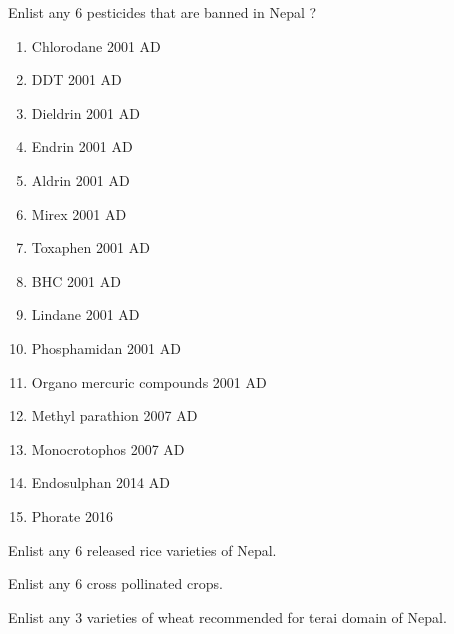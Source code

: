 \documentclass[10pt,a4paper]{exam}
\begin{document}
\begin{questions}
\question Enlist any 6 pesticides that are banned in Nepal ?
  \begin{solution}
  \begin{enumerate}
  \item Chlorodane 2001 AD
  \item DDT 2001 AD
  \item Dieldrin 2001 AD
  \item Endrin 2001 AD
  \item Aldrin 2001 AD
  \item Mirex 2001 AD
  \item Toxaphen 2001 AD
  \item BHC 2001 AD
  \item Lindane 2001 AD
  \item Phosphamidan 2001 AD
  \item Organo mercuric compounds 2001 AD
  \item Methyl parathion 2007 AD
  \item Monocrotophos 2007 AD
  \item Endosulphan 2014 AD
  \item Phorate 2016
  \end{enumerate}
  \end{solution}

\question Enlist any 6 released rice varieties of Nepal.

\question Enlist any 6 cross pollinated crops.

\question Enlist any 3 varieties of wheat recommended for terai domain of Nepal.

\end{questions}
\end{document}
